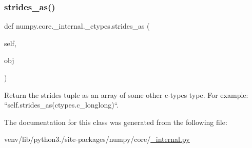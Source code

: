 \subsubsection{\texorpdfstring{strides\+\_\+as()}{strides\_as()}}
{\footnotesize\ttfamily def numpy.\+core.\+\_\+internal.\+\_\+ctypes.\+strides\+\_\+as (\begin{DoxyParamCaption}\item[{}]{self,  }\item[{}]{obj }\end{DoxyParamCaption})}

\begin{DoxyVerb}Return the strides tuple as an array of some other
c-types type. For example: ``self.strides_as(ctypes.c_longlong)``.
\end{DoxyVerb}
 

The documentation for this class was generated from the following file\+:\begin{DoxyCompactItemize}
\item 
venv/lib/python3./site-\/packages/numpy/core/\hyperlink{__internal_8py}{\+\_\+internal.\+py}\end{DoxyCompactItemize}
